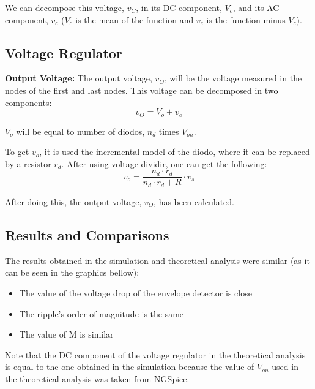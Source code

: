 We can decompose this voltage, $v_C$, in its DC component, $V_c$, and its AC component, $v_c$ ($V_c$ is the mean of the function and $v_c$ is the function minus $V_c$).


\subsection{Voltage Regulator}

\textbf{Output Voltage:}
The output voltage, $v_O$, will be the voltage measured in the nodes of the first and last nodes.
This voltage can be decomposed in two components: $$v_O = V_o + v_o$$

$V_o $ will be equal to number of diodos, $n_d$ times $V_{on}$.

To get $v_o$, it is used the incremental model of the diodo, where it can be replaced by a resistor $r_d$.
After using voltage dividir, one can get the following:
$$ v_o = \frac{n_d \cdot r_d}{n_d \cdot r_d + R} \cdot v_s$$

After doing this, the output voltage, $v_O$, has been calculated.





\subsection{Results and Comparisons}



The results obtained in the simulation and theoretical analysis were similar (as it can be seen in the graphics bellow):

\begin{itemize}
  \item The value of the voltage drop of the envelope detector is close
  \item The ripple's order of magnitude is the same
  \item The value of M is similar
\end{itemize}

Note that the DC component of the voltage regulator in the theoretical analysis is equal to the one obtained in the simulation because the value of $V_{on}$ used in the theoretical analysis was taken from NGSpice. 

